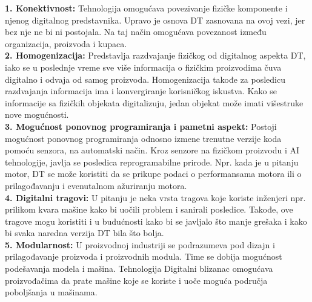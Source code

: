 \documentclass[a4paper]{article}
\begin{document}
{\textbf{1. Konektivnost:} Tehnologija omogućava povezivanje fizičke komponente i njenog digitalnog
predstavnika. Upravo je osnova DT zasnovana na ovoj vezi, jer bez nje ne bi ni
postojala. Na taj način omogućava povezanost između organizacija, proizvoda i kupaca. \cite{smartconnecting} \\

\textbf{2. Homogenizacija:} Predstavlja razdvajanje fizičkog od digitalnog aspekta DT, iako
se u poslednje vreme sve više informacija o fizičkim proizvodima čuva digitalno i odvaja od
samog proizvoda. Homogenizacija takođe za posledicu razdvajanja informacija ima i
konvergiranje korisničkog iskustva. Kako se informacije sa fizičkih objekata digitalizuju, jedan
objekat može imati višestruke nove mogućnosti. \cite{digitalinfrastructures} \\

\textbf{3. Mogućnost ponovnog programiranja i pametni aspekt:} Postoji mogućnost ponovnog
programiranja odnosno izmene trenutne verzije koda pomoću senzora, na automatski način. Kroz
senzore na fizičkom proizvodu i AI tehnologije, javlja se posledica reprogramabilne prirode. Npr.
kada je u pitanju motor, DT se može koristiti da se prikupe podaci o performansama
motora ili o prilagođavanju i evenutalnom ažuriranju motora.\cite{seeingdouble}\\

\textbf{4. Digitalni tragovi: } U pitanju je neka vrsta tragova koje koriste inženjeri npr. prilikom kvara
mašine kako bi uočili problem i sanirali posledice. Takođe, ove tragove mogu koristiti i u
budućnosti kako bi se javljalo što manje grešaka i kako bi svaka naredna verzija DT
bila što bolja. \cite{sensordata}\\

\textbf{5. Modularnost:} U proizvodnoj industriji se podrazumeva pod dizajn i prilagođavanje proizvoda
i proizvodnih modula. Time se dobija mogućnost podešavanja modela i mašina. Tehnologija
Digitalni blizanac omogućava proizvođačima da prate mašine koje se koriste i uoče moguća područja
poboljšanja u mašinama.\cite{autonomy}

}
\end{document}
